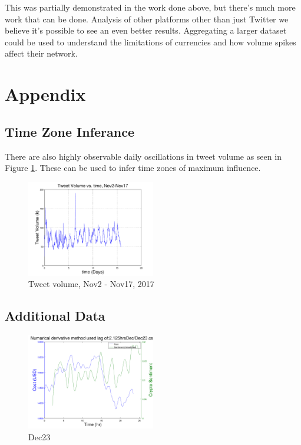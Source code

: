 \documentclass[12pt,journal,compsoc]{IEEEtran}
\begin{document}
This was partially demonstrated in the work done above, but there's much more work that can be done. Analysis of other platforms
other than just Twitter we believe it's possible to see an even better results. Aggregating a larger dataset could be 
used to understand the limitations of currencies and how volume spikes affect their network.

\section{Appendix}
\subsection{Time Zone Inferance}
There are also highly observable daily oscillations in tweet volume as seen in Figure \ref{fig:OSC}. 
These can be used to infer time zones of maximum influence.
\begin{figure}[h!]
	\centering
	\includegraphics[width=0.5\textwidth]{../Datasets/Plots/TweetVolume}
	\caption{Tweet volume, Nov2 - Nov17, 2017}
	\label{fig:OSC}
\end{figure}

\subsection{Additional Data}

\begin{figure}[h!]
	\centering
	\includegraphics[width=0.5\textwidth]{../Datasets/Plots/Dec23}
	\caption{Dec23}
	\label{fig:Dec23}
\end{figure}
\end{document}
